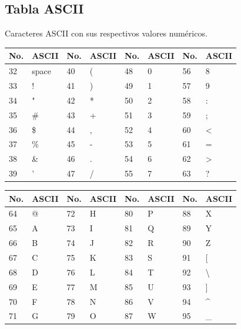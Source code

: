\documentclass[10pt,landscape,twocolumn,letterpaper,twosided]{article}
\begin{document}
		\subsection{Tabla ASCII}
			Caracteres ASCII con sus respectivos valores numéricos.
		\begin{table}[H]
			\begin{tabular}{|l|l|l|l|l|l|l|l|}
				\hline \textbf{No.} & \textbf{ASCII} & \textbf{No.} & \textbf{ASCII}  &
					\textbf{No.} & \textbf{ASCII} & \textbf{No.} & \textbf{ASCII} \\ \hline
				32 & space & 40 & ( & 48 & 0 & 56 & 8 \\ \hline
				33 &  ! & 41 & ) & 49 & 1 & 57 & 9 \\ \hline
				34 &  " & 42 & * & 50 & 2 & 58 & : \\ \hline
				35 & \# & 43 & + & 51 & 3 & 59 & ; \\ \hline
				36 & \$ & 44 & , & 52 & 4 & 60 & < \\ \hline
				37 & \% & 45 & - & 53 & 5 & 61 & = \\ \hline
				38 & \& & 46 & . & 54 & 6 & 62 & > \\ \hline
				39 &  ' & 47 & / & 55 & 7 & 63 & ? \\ \hline
			\end{tabular}
		\end{table}
		
		
			\begin{tabular}{|l|l|l|l|l|l|l|l|}
				\hline \textbf{No.} & \textbf{ASCII} & \textbf{No.} & \textbf{ASCII}  &
					\textbf{No.} & \textbf{ASCII} & \textbf{No.} & \textbf{ASCII} \\ \hline
				64 & @ & 72 & H & 80 & P & 88 & X \\ \hline
				65 & A & 73 & I & 81 & Q & 89 & Y \\ \hline
				66 & B & 74 & J & 82 & R & 90 & Z \\ \hline
				67 & C & 75 & K & 83 & S & 91 & [ \\ \hline
				68 & D & 76 & L & 84 & T & 92 & \textbackslash \\ \hline
				69 & E & 77 & M & 85 & U & 93 & ] \\ \hline
				70 & F & 78 & N & 86 & V & 94 & \textasciicircum \\ \hline
				71 & G & 79 & O & 87 & W & 95 & \_ \\ \hline
			\end{tabular}
		
\end{document}
